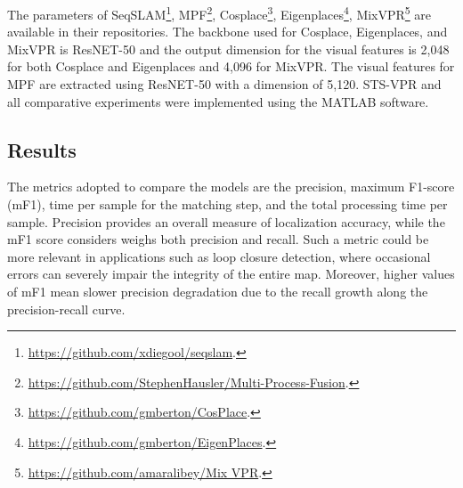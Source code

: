 \documentclass[letterpaper, 10 pt, conference]{ieeeconf}  %
\begin{document}
The parameters of SeqSLAM\footnote{\href{https://github.com/xdiegool/seqslam}{https://github.com/xdiegool/seqslam}.}, MPF\footnote{\href{https://github.com/StephenHausler/Multi-Process-Fusion}{https://github.com/StephenHausler/Multi-Process-Fusion}.}, Cosplace\footnote{\href{https://github.com/gmberton/CosPlace}{https://github.com/gmberton/CosPlace}.}, Eigenplaces\footnote{\href{https://github.com/gmberton/EigenPlaces}{https://github.com/gmberton/EigenPlaces}.}, MixVPR\footnote{\href{https://github.com/amaralibey/MixVPR.git}{https://github.com/amaralibey/Mix
VPR}.} are available in their repositories. The backbone used for Cosplace, Eigenplaces, and MixVPR is ResNET-50 and the output dimension for the visual features is 2,048 for both Cosplace and Eigenplaces and 4,096 for MixVPR. The visual features for MPF are extracted using ResNET-50 with a dimension of 5,120. STS-VPR and all comparative experiments were implemented using the MATLAB software.



\begin{table}[t]
\centering
\caption{Model performance comparison with short sequences.}
\label{tab:short_results}







\end{table}


\begin{table}[t]
\centering
\caption{Model performance comparison with long sequences.}
\label{tab:long_results}







\end{table}

\subsection{Results}\label{sub:results}

The metrics adopted to compare the models are the precision, maximum F1-score (mF1), time per sample for the matching step, and the total processing time per sample. Precision provides an overall measure of localization accuracy, while the mF1 score considers weighs both precision and recall. Such a metric could be more relevant in applications such as loop closure detection, where occasional errors can severely impair the integrity of the entire map. Moreover, higher values of mF1 mean slower precision degradation due to the recall growth along the precision-recall curve. 
\end{document}

